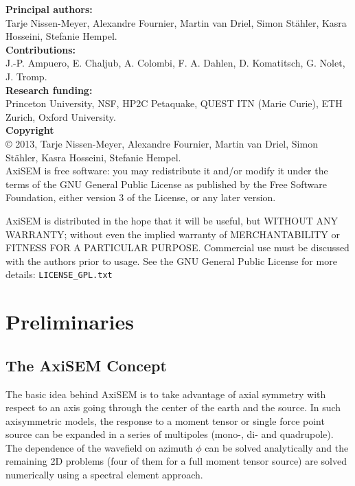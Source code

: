 \documentclass{article}
\begin{document}
%
\noindent \textbf{Principal authors:} \\
Tarje Nissen-Meyer, Alexandre
Fournier, Martin van Driel, Simon St\"{a}hler, Kasra Hosseini, Stefanie Hempel.\vspace*{0.3cm}\\
\noindent \textbf{Contributions:}\\
 J.-P. Ampuero, E. Chaljub, A. Colombi, F. A. Dahlen, D. Komatitsch,
 G. Nolet, J. Tromp.\vspace*{0.3cm}\\
\noindent \textbf{Research funding:} \\Princeton University, NSF, HP2C Petaquake, 
QUEST ITN (Marie Curie), ETH Zurich, Oxford University.\vspace*{0.3cm}\\
%
\noindent \textbf{Copyright}\\
\copyright  \hspace*{0.1cm} 
2013, Tarje Nissen-Meyer,
Alexandre Fournier, Martin van Driel, Simon St\"{a}hler, Kasra Hosseini, Stefanie Hempel.\vspace*{0.3cm}\\

AxiSEM is free software: you may redistribute it and/or modify it
under the terms of the GNU General Public License as published by the
Free Software Foundation, either version 3 of the License, or any
later version.

AxiSEM is distributed in the hope that it will be useful, but WITHOUT
ANY WARRANTY; without even the implied warranty of MERCHANTABILITY or
FITNESS FOR A PARTICULAR PURPOSE. Commercial use must be discussed
with the authors prior to usage. See the GNU General Public License
for more details: \verb|LICENSE_GPL.txt|
\newpage
\tableofcontents
%
\vspace*{1cm}

\section{Preliminaries}

\subsection{The AxiSEM Concept}

The basic idea behind AxiSEM is to take advantage of axial symmetry with respect
to an axis going through the center of the earth and the source. In such axisymmetric 
models, the response to a moment tensor or single force point source can be expanded in a
series of multipoles (mono-, di- and quadrupole). The dependence of the wavefield on
azimuth $\phi$ can be solved analytically and the remaining 2D problems (four of them for
a full moment tensor source) are solved numerically using a spectral
element approach.\\
\end{document}
